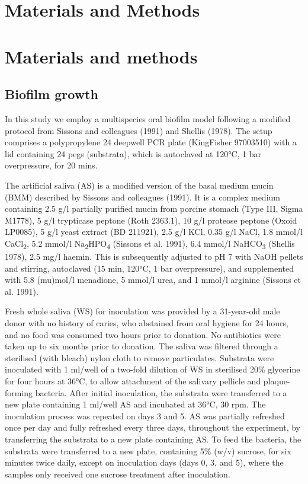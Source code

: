 \documentclass[
]{article}
\begin{document}
\hypertarget{materials-and-methods}{%
\section{Materials and Methods}\label{materials-and-methods}}

\hypertarget{materials-and-methods-1}{%
\section{Materials and methods}\label{materials-and-methods-1}}

\hypertarget{biofilm-growth}{%
\subsection{Biofilm growth}\label{biofilm-growth}}

In this study we employ a multispecies oral biofilm model following a
modified protocol from Sissons and colleagues (1991) and Shellis (1978).
The setup comprises a polypropylene 24 deepwell PCR plate (KingFisher
97003510) with a lid containing 24 pegs (substrata), which is autoclaved
at 120°C, 1 bar overpressure, for 20 mins.

The artificial saliva (AS) is a modified version of the basal medium
mucin (BMM) described by Sissons and colleagues (1991). It is a complex
medium containing 2.5 g/l partially purified mucin from porcine stomach
(Type III, Sigma M1778), 5 g/l trypticase peptone (Roth 2363.1), 10 g/l
proteose peptone (Oxoid LP0085), 5 g/l yeast extract (BD 211921), 2.5
g/l KCl, 0.35 g/l NaCl, 1.8 mmol/l CaCl\textsubscript{2}, 5.2 mmol/l
Na\textsubscript{2}HPO\textsubscript{4} (Sissons et al. 1991), 6.4
mmol/l NaHCO\textsubscript{3} (Shellis 1978), 2.5 mg/l haemin. This is
subsequently adjusted to pH 7 with NaOH pellets and stirring, autoclaved
(15 min, 120°C, 1 bar overpressure), and supplemented with 5.8 (mu)mol/l
menadione, 5 mmol/l urea, and 1 mmol/l arginine (Sissons et al. 1991).

Fresh whole saliva (WS) for inoculation was provided by a 31-year-old
male donor with no history of caries, who abstained from oral hygiene
for 24 hours, and no food was consumed two hours prior to donation. No
antibiotics were taken up to six months prior to donation. The saliva
was filtered through a sterilised (with bleach) nylon cloth to remove
particulates. Substrata were inoculated with 1 ml/well of a two-fold
dilution of WS in sterilised 20\% glycerine for four hours at 36°C, to
allow attachment of the salivary pellicle and plaque-forming bacteria.
After initial inoculation, the substrata were transferred to a new plate
containing 1 ml/well AS and incubated at 36°C, 30 rpm. The inoculation
process was repeated on days 3 and 5. AS was partially refreshed once
per day and fully refreshed every three days, throughout the experiment,
by transferring the substrata to a new plate containing AS. To feed the
bacteria, the substrata were transferred to a new plate, containing 5\%
(w/v) sucrose, for six minutes twice daily, except on inoculation days
(days 0, 3, and 5), where the samples only received one sucrose
treatment after inoculation.
\end{document}
